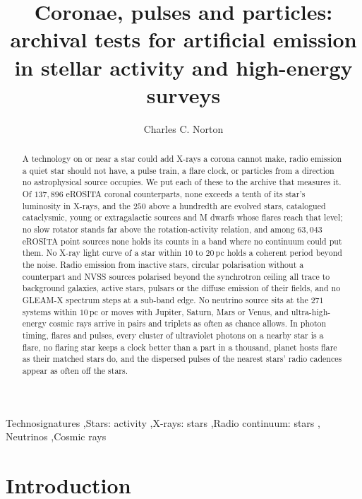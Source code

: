 \documentclass[3p,11pt]{elsarticle}
\begin{document}
\begin{frontmatter}

\title{Coronae, pulses and particles: archival tests for artificial emission in stellar activity and high-energy surveys}

\author{Charles C. Norton}

\begin{abstract}
A technology on or near a star could add X-rays a corona cannot make, radio emission a
quiet star should not have, a pulse train, a flare clock, or particles from a direction
no astrophysical source occupies. We put each of these to the archive that measures it.
Of $137{,}896$ eROSITA coronal counterparts, none exceeds a tenth of its star's
luminosity in X-rays, and the $250$ above a hundredth are evolved stars, catalogued
cataclysmic, young or extragalactic sources and M dwarfs whose flares reach that level;
no slow rotator stands far above the rotation-activity relation, and among $63{,}043$
eROSITA point sources none holds its counts in a band where no continuum could put
them. No X-ray light curve of a star within $10$ to $20$\,pc holds a coherent period
beyond the noise. Radio emission from inactive stars, circular polarisation without a
counterpart and NVSS sources polarised beyond the synchrotron ceiling all trace to
background galaxies, active stars, pulsars or the diffuse emission of their fields, and
no GLEAM-X spectrum steps at a sub-band edge. No neutrino source sits at the $271$
systems within $10$\,pc or moves with Jupiter, Saturn, Mars or Venus, and ultra-high-energy
cosmic rays arrive in pairs and triplets as often as chance allows. In photon timing,
flares and pulses, every cluster of ultraviolet photons on a nearby star is a flare, no
flaring star keeps a clock better than a part in a thousand, planet hosts flare as their
matched stars do, and the dispersed pulses of the nearest stars' radio cadences appear
as often off the stars.
\end{abstract}

\begin{keyword}
Technosignatures \sep Stars: activity \sep X-rays: stars \sep Radio continuum: stars \sep
Neutrinos \sep Cosmic rays
\end{keyword}

\end{frontmatter}

\section{Introduction}\label{sec:intro}
\end{document}
